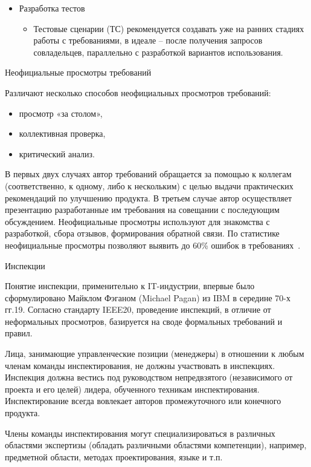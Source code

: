 \documentclass{../industrial-development}
\begin{document}
{\begin{frame}
\begin{itemize}
\item  \alert{Разработка тестов}
\begin{itemize}
\item Тестовые сценарии (ТС) рекомендуется создавать уже на ранних стадиях работы с требованиями, в идеале – после получения запросов совладельцев, параллельно с разработкой вариантов использования.
\end{itemize}
\end{itemize}
\end{frame}

\lecturenotes

\alert{Неофициальные просмотры требований}

Различают несколько способов неофициальных просмотров требований:
\begin{itemize}
\item просмотр «за столом»,
\item коллективная проверка,
\item критический анализ.
\end{itemize}

В первых двух случаях автор требований обращается за помощью к коллегам (соответственно, к одному, либо к нескольким) с целью выдачи практических рекомендаций по улучшению продукта. В третьем случае автор осуществляет презентацию разработанные им требования на совещании с последующим обсуждением. Неофициальные просмотры используют для знакомства с разработкой, сбора
отзывов, формирования обратной связи. По статистике неофициальные просмотры позволяют выявить до 60\% ошибок в требованиях~\cite[с.~66-67]{Maglinec}.

\alert{Инспекции}

Понятие инспекции, применительно к IT-индустрии, впервые было сформулировано Майклом Фэганом (Michael Pagan) из IBM в середине 70-х гг.19. Согласно стандарту IEEE20, проведение инспекций, в отличие от неформальных просмотров, базируется на своде формальных требований и правил. 

Лица, занимающие управленческие позиции (менеджеры) в отношении к любым членам команды инспектирования, не должны участвовать в инспекциях. Инспекция должна вестись под руководством непредвзятого (независимого от
проекта и его целей) лидера, обученного техникам инспектирования. Инспектирование всегда вовлекает авторов промежуточного или конечного
продукта.

Члены команды инспектирования могут специализироваться в различных областями экспертизы (обладать различными областями компетенции), например, предметной области, методах проектирования, языке и т.п. 

}
\end{document}
